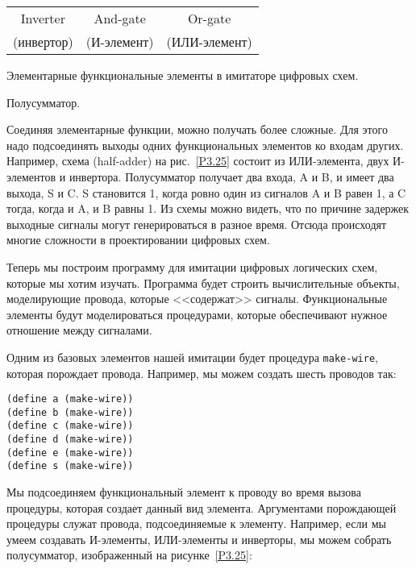 \begin{cntrfig}


\begin{tabular}{ccc}
Inverter   & And-gate  &Or-gate \\
(инвертор) &(И-элемент) &  (ИЛИ-элемент)
\end{tabular}
\caption{Элементарные функциональные элементы в
имитаторе цифровых схем.}
\label{P3.24}

\end{cntrfig}


\begin{cntrfig}

\caption{Полусумматор.}
\label{P3.25}

\end{cntrfig}

Соединяя элементарные функции, можно получать более
сложные.  Для этого надо подсоединять выходы одних функциональных
элементов ко входам других. Например, схема
 (half-adder) на
рис.~\ref{P3.25} состоит из ИЛИ-элемента, двух И-элементов
и инвертора.  Полусумматор получает два входа,  A и B, и имеет два
выхода, S и C.  S становится 1, когда ровно один из сигналов A и B
равен 1, а C тогда, когда и A, и B  равны 1.  Из схемы можно видеть,
что по причине задержек выходные сигналы могут генерироваться в разное
время.  Отсюда происходят многие сложности в проектировании
цифровых схем.
\pagebreak

Теперь мы построим программу для имитации цифровых
логических схем, которые мы хотим изучать.  Программа будет строить
вычислительные объекты, моделирующие провода, которые <<содержат>>
сигналы.  Функциональные элементы будут моделироваться процедурами,
которые обеспечивают нужное отношение между сигналами.

Одним из базовых элементов нашей имитации будет процедура
{\tt make-wire},
которая порождает провода.  Например, мы можем
создать шесть проводов так:

\begin{Verbatim}[fontsize=\small]
(define a (make-wire))
(define b (make-wire))
(define c (make-wire))
(define d (make-wire))
(define e (make-wire))
(define s (make-wire))
\end{Verbatim}
Мы подсоединяем функциональный элемент к проводу во время вызова
процедуры, которая создает данный вид элемента.  Аргументами
порождающей процедуры служат провода, подсоединяемые к
элементу.  Например, если мы умеем создавать И-элементы, ИЛИ-элементы
и инверторы, мы можем собрать полусумматор, изображенный на
рисунке~\ref{P3.25}:

